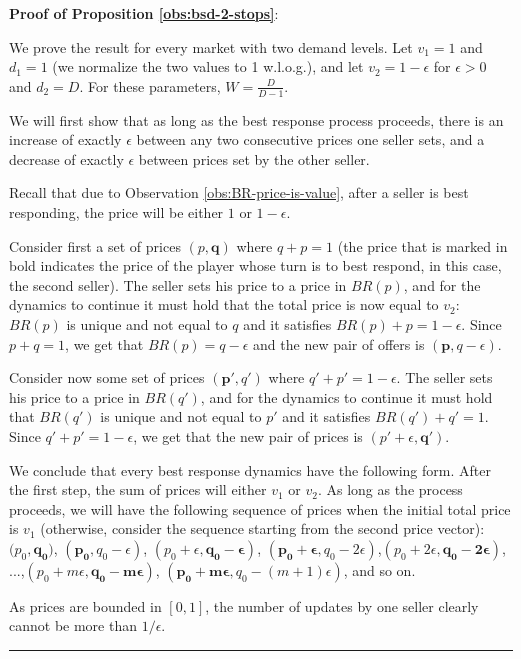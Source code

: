 \documentclass[11pt,a4paper]{article}
\newcommand{\qed}{\rule{1.5mm}{2mm}\vspace{0.1in}}
\newenvironment{proof}{\par\noindent{\bf Proof:}}{\qed}
\begin{document}
\noindent \textbf{Proof of Proposition \ref{obs:bsd-2-stops}}:
\begin{proof}
	We prove the result for every market with two demand levels.
	Let $v_1=1$ and $d_1=1$ (we normalize the two values to 1 w.l.o.g.), and let $v_2=1-\epsilon$ for $\epsilon>0$ and $d_2=D$.
	For these parameters, $W=\frac{D}{D-1}$.
	
	We will first show that as long as the best response process proceeds,
	there is an increase of exactly $\epsilon$ between any two consecutive prices one seller sets, and a decrease of exactly $\epsilon$ between prices set by the other seller.
	
	Recall that due to Observation \ref{obs:BR-price-is-value}, after a seller is best responding, the price will be either $1$ or $1-\epsilon$. %

	
	Consider first a set of prices $(p,\mathbf{q})$ where $q+p=1$ (the price that is marked in bold indicates the price of the player whose turn is to best respond, in this case, the second seller).
	The seller sets his price to a price in $BR(p)$,
	and for the dynamics to continue it must hold that the total price is now equal to $v_2$:
	$BR(p)$ is unique and not equal to $q$ and it satisfies $BR(p)+p=1-\epsilon$. Since $p+q=1$, we get that
	$BR(p)=q-\epsilon$ and the new pair of offers is $(\mathbf{p},q-\epsilon)$.
	
	Consider now some set of prices $(\mathbf{p'},q')$ where $q'+p'=1-\epsilon$.
	The seller sets his price to a price in $BR(q')$,
	and for the dynamics to continue it must hold that $BR(q')$ is unique and not equal to $p'$ and it satisfies
	$BR(q')+q'=1$. Since $q'+p'=1-\epsilon$, we get that the new pair of prices is $(p'+\epsilon,\mathbf{q'})$.
	
	We conclude that every best response dynamics have the following form.
	After the first step, the sum of prices will either $v_1$ or $v_2$.
	As long as the process proceeds, we will have the following sequence of prices when the initial total price is $v_1$ (otherwise, consider the sequence starting from the second price vector):
	$(p_0,\pmb{q_0)}$,
	$(\pmb{p_0},q_0-\epsilon)$,
	$(p_0+\epsilon,\pmb{q_0-\epsilon})$,
	$(\pmb{p_0+\epsilon},q_0-2\epsilon)$,$(p_0+2\epsilon,\pmb{q_0-2\epsilon})$,
	$...$,$(p_0+m\epsilon,\pmb{q_0-m\epsilon})$,
	$(\pmb{p_0+m\epsilon},q_0-(m+1)\epsilon)$, and so on.
	
	As prices are bounded in $[0,1]$, the number of updates by one seller clearly cannot be more than $1/\epsilon$.
	

\end{proof}
\end{document}
